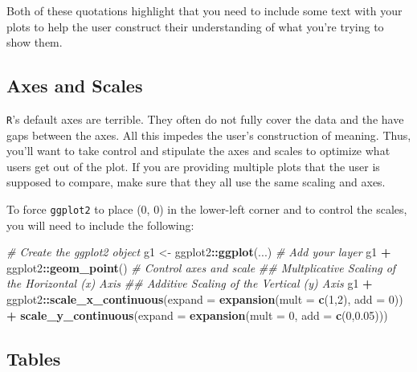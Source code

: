 \documentclass[]{book}
\newenvironment{Shaded}{\begin{snugshade}}{\end{snugshade}}
\newcommand{\CommentTok}[1]{\textcolor[rgb]{0.56,0.35,0.01}{\textit{#1}}}
\newcommand{\DataTypeTok}[1]{\textcolor[rgb]{0.13,0.29,0.53}{#1}}
\newcommand{\DecValTok}[1]{\textcolor[rgb]{0.00,0.00,0.81}{#1}}
\newcommand{\FloatTok}[1]{\textcolor[rgb]{0.00,0.00,0.81}{#1}}
\newcommand{\KeywordTok}[1]{\textcolor[rgb]{0.13,0.29,0.53}{\textbf{#1}}}
\newcommand{\NormalTok}[1]{#1}
\newcommand{\OperatorTok}[1]{\textcolor[rgb]{0.81,0.36,0.00}{\textbf{#1}}}
\newcommand{\StringTok}[1]{\textcolor[rgb]{0.31,0.60,0.02}{#1}}
\begin{document}
Both of these quotations highlight that you need to include some text with your plots to help the user construct their understanding of what you're trying to show them.

\hypertarget{axes-and-scales}{%
\subsection{Axes and Scales}\label{axes-and-scales}}

\texttt{R}'s default axes are terrible. They often do not fully cover the data and the have gaps between the axes. All this impedes the user's construction of meaning. Thus, you'll want to take control and stipulate the axes and scales to optimize what users get out of the plot. If you are providing multiple plots that the user is supposed to compare, make sure that they all use the same scaling and axes.

To force \texttt{ggplot2} to place (0, 0) in the lower-left corner and to control the scales, you will need to include the following:

\begin{Shaded}
\begin{Highlighting}[]
\CommentTok{# Create the ggplot2 object}
\NormalTok{g1 <-}\StringTok{ }\NormalTok{ggplot2}\OperatorTok{::}\KeywordTok{ggplot}\NormalTok{(...)}
\CommentTok{# Add your layer}
\NormalTok{g1 }\OperatorTok{+}\StringTok{ }\NormalTok{ggplot2}\OperatorTok{::}\KeywordTok{geom_point}\NormalTok{()}
\CommentTok{# Control axes and scale}
\CommentTok{## Multplicative Scaling of the Horizontal (x) Axis}
\CommentTok{## Additive Scaling of the Vertical (y) Axis}
\NormalTok{g1 }\OperatorTok{+}\StringTok{ }\NormalTok{ggplot2}\OperatorTok{::}\KeywordTok{scale_x_continuous}\NormalTok{(}\DataTypeTok{expand =} \KeywordTok{expansion}\NormalTok{(}\DataTypeTok{mult =} \KeywordTok{c}\NormalTok{(}\DecValTok{1}\NormalTok{,}\DecValTok{2}\NormalTok{), }\DataTypeTok{add =} \DecValTok{0}\NormalTok{)) }\OperatorTok{+}\StringTok{ }
\StringTok{  }\KeywordTok{scale_y_continuous}\NormalTok{(}\DataTypeTok{expand =} \KeywordTok{expansion}\NormalTok{(}\DataTypeTok{mult =} \DecValTok{0}\NormalTok{, }\DataTypeTok{add =} \KeywordTok{c}\NormalTok{(}\DecValTok{0}\NormalTok{,}\FloatTok{0.05}\NormalTok{))) }
\end{Highlighting}
\end{Shaded}

\hypertarget{tables}{%
\subsection{Tables}\label{tables}}
\end{document}
